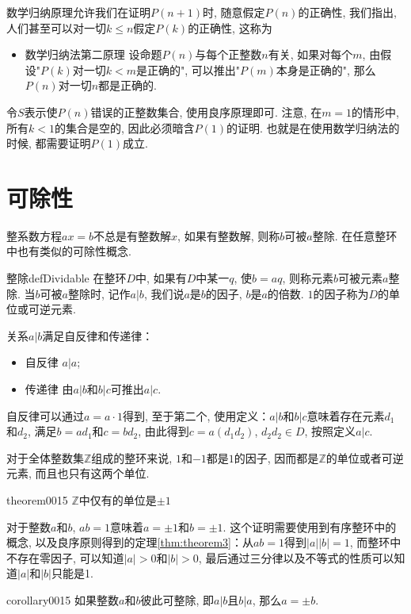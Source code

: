 数学归纳原理允许我们在证明$P(n+1)$时, 随意假定$P(n)$的正确性, 我们指出, 人们甚至可以对一切$k \le n$假定$P(k)$的正确性, 这称为
\begin{itemize}
\item \textcolor{main}{数学归纳法第二原理} 设命题$P(n)$与每个正整数$n$有关, 如果对每个$m$, 由假设"$P(k)$对一切$k <m$是正确的", 可以推出"$P(m)$本身是正确的", 那么$P(n)$对一切$n$都是正确的. 
\end{itemize}

令$S$表示使$P(n)$错误的正整数集合, 使用良序原理即可. 注意, 在$m=1$的情形中, 所有$k<1$的集合是空的, 因此必须暗含$P(1)$的证明. 也就是在使用数学归纳法的时候, 都需要证明$P(1)$成立. 

\section{可除性}
整系数方程$ax=b$不总是有整数解$x$, 如果有整数解, 则称$b$可被$a$整除. 在任意整环中也有类似的可除性概念. 
\begin{definition}{整除}{defDividable}
在整环$D$中, 如果有$D$中某一$q$, 使$b=aq$, 则称元素$b$可被元素$a$整除. 当$b$可被$a$整除时, 记作$a|b$, 我们说$a$是$b$的因子, $b$是$a$的倍数. $1$的因子称为$D$的单位或可逆元素. 
\end{definition}
关系$a|b$满足自反律和传递律：
\begin{itemize}
\item 自反律 $a|a$;
\item 传递律 由$a|b$和$b|c$可推出$a|c$.
\end{itemize}
自反律可以通过$a=a\cdot{}1$得到, 至于第二个, 使用定义：$a|b$和$b|c$意味着存在元素$d_1$和$d_2$, 满足$b=ad_1$和$c=bd_2$, 由此得到$c=a(d_1d_2)$, $d_2d_2 \in D$, 按照定义$a|c$. 


对于全体整数集$\mathbb{Z}$组成的整环来说, $1$和$-1$都是$1$的因子, 因而都是$\mathbb{Z}$的单位或者可逆元素, 而且也只有这两个单位. 
\begin{theorem}{}{theorem0015}
$\mathbb{Z}$中仅有的单位是$\pm1$
\end{theorem}
对于整数$a$和$b$, $ab=1$意味着$a=\pm1$和$b=\pm1$. 这个证明需要使用到有序整环中的概念, 以及良序原则得到的定理\ref{thm:theorem3}：从$ab=1$得到$|a||b|=1$, 而整环中不存在零因子, 可以知道$|a|>0$和$|b|>0$, 最后通过三分律以及不等式的性质可以知道$|a|$和$|b|$只能是1.

\begin{corollary}{}{corollary0015}
如果整数$a$和$b$彼此可整除, 即$a|b$且$b|a$, 那么$a=\pm{}b$. 
\end{corollary}

